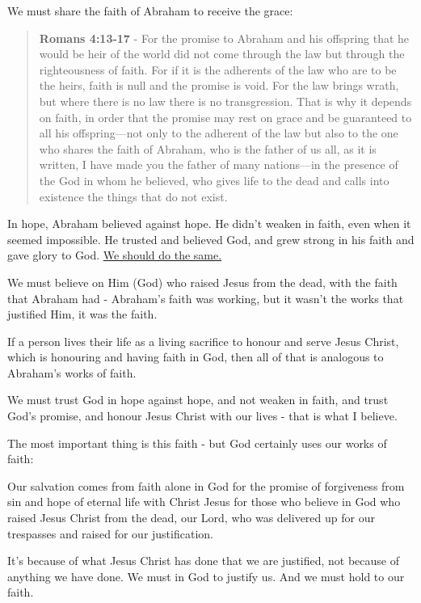 \documentclass[11pt]{article}
\begin{document}
We must share the faith of Abraham to receive the grace:

\begin{quote}
\textbf{Romans 4:13-17} - For the promise to Abraham and his offspring that he would be heir of the world did not come through the law but through the righteousness of faith. For if it is the adherents of the law who are to be the heirs, faith is null and the promise is void. For the law brings wrath, but where there is no law there is no transgression. That is why it depends on faith, in order that the promise may rest on grace and be guaranteed to all his offspring—not only to the adherent of the law but also to the one who shares the faith of Abraham, who is the father of us all, as it is written, I have made you the father of many nations—in the presence of the God in whom he believed, who gives life to the dead and calls into existence the things that do not exist.
\end{quote}

In hope, Abraham believed against hope. He didn't weaken in faith, even when it seemed impossible.
He trusted and believed God, and grew strong in his faith and gave glory to God. \uline{We should do the same.}

We must believe on Him (God) who raised Jesus from the dead, with the faith that Abraham had - Abraham's faith was working, but it wasn't the works that justified Him, it was the faith.

If a person lives their life as a living sacrifice to honour and serve Jesus Christ, which is honouring and having faith in God, then all of that is analogous to Abraham's works of faith.

We must trust God in hope against hope, and not weaken in faith, and trust God's promise, and honour Jesus Christ with our lives - that is what I believe.

The most important thing is this faith - but God certainly uses our works of faith:

Our salvation comes from faith alone in God for the promise of forgiveness from sin and hope of eternal life with Christ Jesus for those who believe in God who raised Jesus Christ from the dead, our Lord, who was delivered up for our trespasses and raised for our justification.

It's because of what Jesus Christ has done that we are justified, not because of anything we have done. We must in God to justify us. And we must hold to our faith.
\end{document}
